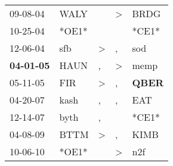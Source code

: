 \begin{supertabular}{p{0.07\textwidth}p{0.06\textwidth}p{0.02\textwidth}p{0.02\textwidth}p{0.06\textwidth}}
          09-08-04\textsuperscript{} &  WALY\textsuperscript{} &               &  \textgreater &           BRDG\textsuperscript{} \\
          10-25-04\textsuperscript{} &                   *OE1* &               &               &                            *CE1* \\
          12-06-04\textsuperscript{} &   sfb\textsuperscript{} &  \textgreater &             , &            sod\textsuperscript{} \\
 \textbf{04-01-05\textsuperscript{}} &  HAUN\textsuperscript{} &             , &  \textgreater &           memp\textsuperscript{} \\
          05-11-05\textsuperscript{} &   FIR\textsuperscript{} &  \textgreater &             , &  \textbf{QBER\textsuperscript{}} \\
          04-20-07\textsuperscript{} &  kash\textsuperscript{} &             , &             , &            EAT\textsuperscript{} \\
          12-14-07\textsuperscript{} &  byth\textsuperscript{} &             , &               &                            *CE1* \\
          04-08-09\textsuperscript{} &  BTTM\textsuperscript{} &  \textgreater &             , &           KIMB\textsuperscript{} \\
          10-06-10\textsuperscript{} &                   *OE1* &               &  \textgreater &            n2f\textsuperscript{} \\
\end{supertabular}
